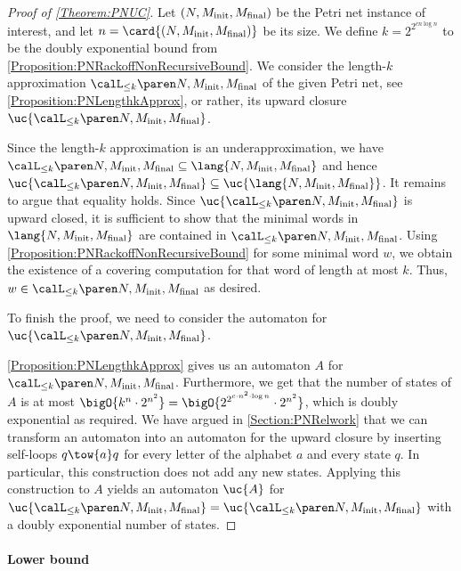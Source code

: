 \documentclass[../../diss.tex]{subfiles}
\begin{document}
\begin{proof}[Proof of \cref{Theorem:PNUC}]
    Let $(N,M_{\text{init}},M_{\text{final}})$ be the Petri net instance of interest, and let $n = \card{(N,\Minit,\Mfinal)}$ be its size.
    We define $k = 2^{2^{c n \log n}}$ to be the doubly exponential bound from \cref{Proposition:PNRackoffNonRecursiveBound}.
    We consider the length-$k$ approximation $\languak{k}{N,\Minit,\Mfinal}$ of the given Petri net, see \cref{Proposition:PNLengthkApprox}, or rather, its upward closure $\uc{\languak{k}{N,\Minit,\Mfinal}}$.

    Since the length-$k$ approximation is an underapproximation, we have $\languak{k}{N,\Minit,\Mfinal} \subseteq \lang{N,\Minit,\Mfinal}$ and hence $\uc{\languak{k}{N,\Minit,\Mfinal}} \subseteq \uc{\lang{N,\Minit,\Mfinal}}$.
    It remains to argue that equality holds.
    Since $\uc{\languak{k}{N,\Minit,\Mfinal}}$ is upward closed, it is sufficient to show that the minimal words in $\lang{N,\Minit,\Mfinal}$ are contained in $\languak{k}{N,\Minit,\Mfinal}$.
    Using \cref{Proposition:PNRackoffNonRecursiveBound} for some minimal word $w$, we obtain the existence of a covering computation for that word of length at most $k$.
    Thus, $w \in \languak{k}{N,\Minit,\Mfinal}$ as desired.

    To finish the proof, we need to consider the automaton for $\uc{\languak{k}{N,\Minit,\Mfinal}}$.

    \cref{Proposition:PNLengthkApprox} gives us an automaton $A$ for $\languak{k}{N,\Minit,\Mfinal}$.
    Furthermore, we get that the number of states of $A$ is at most $\bigO{k^n \cdot 2^{n^2}} = \bigO{2^{2^{c \cdot n^2 \cdot \log n}} \cdot 2^{n^2}}$, which is doubly exponential as required.
    We have argued in \cref{Section:PNRelwork} that we can transform an automaton into an automaton for the upward closure by inserting self-loops $q \tow{a} q$ for every letter of the alphabet $a$ and every state $q$.
    In particular, this construction does not add any new states.
    Applying this construction to $A$ yields an automaton $\uc{A}$ for $\uc{\languak{k}{N,\Minit,\Mfinal}} = \uc{\languak{k}{N,\Minit,\Mfinal}}$ with a doubly exponential number of states.
\end{proof}

\paragraph{Lower bound}
\end{document}

